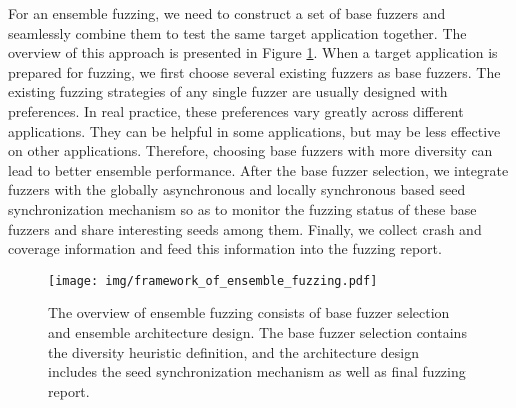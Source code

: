 
For an ensemble fuzzing, we need to construct a set of base fuzzers and seamlessly combine them to test the same target application together. 
The overview of this approach is presented in Figure \ref{fig:framework_of_ensemble_fuzzing}. 
When a target application is prepared for fuzzing, we first choose several existing fuzzers as base fuzzers. 
The existing fuzzing strategies of any single fuzzer %
are usually designed with preferences. In real practice, these preferences vary greatly across different applications. They can be helpful in some applications, but may be less effective on other applications. Therefore, choosing base fuzzers with more diversity can lead to better ensemble performance. %
After the base fuzzer selection, we integrate fuzzers with the globally asynchronous and locally synchronous based seed synchronization mechanism so as to monitor the fuzzing status of these base fuzzers and share interesting seeds among them. 
Finally, we collect crash and coverage information and feed this information into the fuzzing report.

\begin{figure}[!htb]
 \centering
 \texttt{[image: img/framework\_of\_ensemble\_fuzzing.pdf]}
 \vspace{-0.5 cm}
 \caption{The overview of ensemble fuzzing consists of base fuzzer selection and ensemble architecture design. The base fuzzer selection contains the diversity heuristic definition, and the architecture design includes the seed synchronization mechanism as well as final fuzzing report.}
 \vspace{-0.5 cm}
 \label{fig:framework_of_ensemble_fuzzing}
\end{figure}